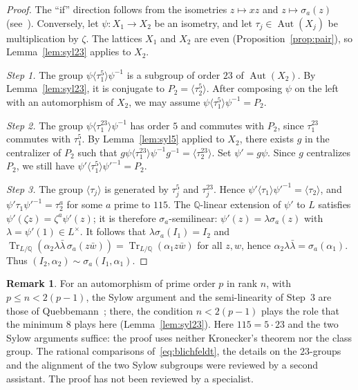 \documentclass[11pt,a4paper]{amsart}
\theoremstyle{plain}
\theoremstyle{definition}
\newtheorem{remark}[theorem]{Remark}
\numberwithin{equation}{section}
\newcommand{\Q}{\mathbb{Q}}
\DeclareMathOperator{\Tr}{Tr}
\DeclareMathOperator{\Aut}{Aut}
\begin{document}
\begin{proof}
The ``if'' direction follows from the isometries $z\mapsto xz$ and $z\mapsto\sigma_a(z)$ (see~\cite[\S5]{BFS05}). Conversely, let $\psi\colon X_1\to X_2$ be an isometry, and let $\tau_j\in\Aut(X_j)$ be multiplication by $\zeta$. The lattices $X_1$ and $X_2$ are even (Proposition~\ref{prop:pair}), so Lemma~\ref{lem:syl23} applies to $X_2$.

\emph{Step 1.} The group $\psi\langle\tau_1^5\rangle\psi^{-1}$ is a subgroup of order $23$ of $\Aut(X_2)$. By Lemma~\ref{lem:syl23}, it is conjugate to $P_2=\langle\tau_2^5\rangle$. After composing $\psi$ on the left with an automorphism of $X_2$, we may assume $\psi\langle\tau_1^5\rangle\psi^{-1}=P_2$.

\emph{Step 2.} The group $\psi\langle\tau_1^{23}\rangle\psi^{-1}$ has order $5$ and commutes with $P_2$, since $\tau_1^{23}$ commutes with $\tau_1^5$. By Lemma~\ref{lem:syl5} applied to $X_2$, there exists $g$ in the centralizer of $P_2$ such that $g\psi\langle\tau_1^{23}\rangle\psi^{-1}g^{-1}=\langle\tau_2^{23}\rangle$. Set $\psi'=g\psi$. Since $g$ centralizes $P_2$, we still have $\psi'\langle\tau_1^5\rangle\psi'^{-1}=P_2$.

\emph{Step 3.} The group $\langle\tau_j\rangle$ is generated by $\tau_j^5$ and $\tau_j^{23}$. Hence $\psi'\langle\tau_1\rangle\psi'^{-1}=\langle\tau_2\rangle$, and $\psi'\tau_1\psi'^{-1}=\tau_2^{a}$ for some $a$ prime to $115$. The $\Q$-linear extension of $\psi'$ to $L$ satisfies $\psi'(\zeta z)=\zeta^a\psi'(z)$; it is therefore $\sigma_a$-semilinear: $\psi'(z)=\lambda\sigma_a(z)$ with $\lambda=\psi'(1)\in L^\times$. It follows that $\lambda\sigma_a(I_1)=I_2$ and $\Tr_{L/\Q}(\alpha_2\lambda\bar\lambda\,\sigma_a(z\bar w))=\Tr_{L/\Q}(\alpha_1z\bar w)$ for all $z,w$, hence $\alpha_2\lambda\bar\lambda=\sigma_a(\alpha_1)$. Thus $(I_2,\alpha_2)\sim\sigma_a(I_1,\alpha_1)$.
\end{proof}

\begin{remark}
For an automorphism of prime order $p$ in rank $n$, with $p\le n<2(p-1)$, the Sylow argument and the semi-linearity of Step~3 are those of Quebbemann~\cite[Satz~3.2\,b), p.~165]{Que81}; there, the condition $n<2(p-1)$ plays the role that the minimum $8$ plays here (Lemma~\ref{lem:syl23}). Here $115=5\cdot23$ and the two Sylow arguments suffice: the proof uses neither Kronecker's theorem nor the class group. The rational comparisons of~\eqref{eq:blichfeldt}, the details on the $23$-groups and the alignment of the two Sylow subgroups were reviewed by a second assistant. The proof has not been reviewed by a specialist.
\end{remark}
\end{document}
